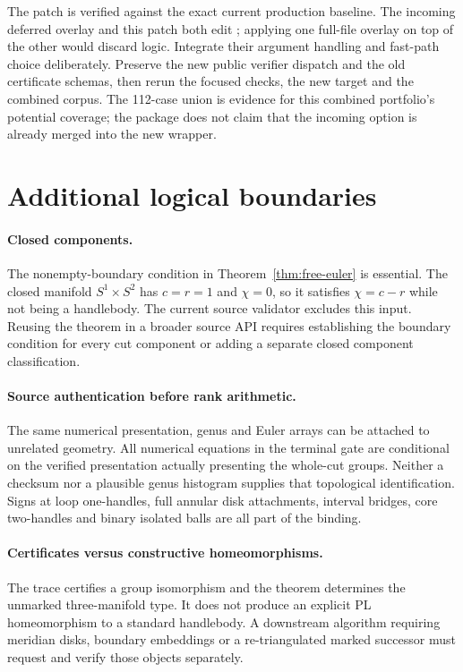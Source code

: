 The patch is verified against the exact current production baseline. The
incoming deferred overlay and this patch both edit
; applying one full-file overlay on top of the
other would discard logic. Integrate their argument handling and fast-path
choice deliberately. Preserve the new public verifier dispatch and the old
certificate schemas, then rerun the focused checks, the new target and the
combined corpus. The 112-case union is evidence for this combined portfolio's
potential coverage; the package does not claim that the incoming
 option is already merged into the new wrapper.

\section{Additional logical boundaries}

\paragraph{Closed components.}
The nonempty-boundary condition in Theorem~\ref{thm:free-euler} is essential.
The closed manifold $S^1\times S^2$ has $c=r=1$ and $\chi=0$, so it satisfies
$\chi=c-r$ while not being a handlebody. The current source validator excludes
this input. Reusing the theorem in a broader source API requires establishing
the boundary condition for every cut component or adding a separate closed
component classification.

\paragraph{Source authentication before rank arithmetic.}
The same numerical presentation, genus and Euler arrays can be attached to
unrelated geometry. All numerical equations in the terminal gate are
conditional on the verified presentation actually presenting the whole-cut
groups. Neither a checksum nor a plausible genus histogram supplies that
topological identification. Signs at loop one-handles, full annular disk
attachments, interval bridges, core two-handles and binary isolated balls are
all part of the binding.

\paragraph{Certificates versus constructive homeomorphisms.}
The trace certifies a group isomorphism and the theorem determines the
unmarked three-manifold type. It does not produce an explicit PL homeomorphism
to a standard handlebody. A downstream algorithm requiring meridian disks,
boundary embeddings or a re-triangulated marked successor must request and
verify those objects separately.

